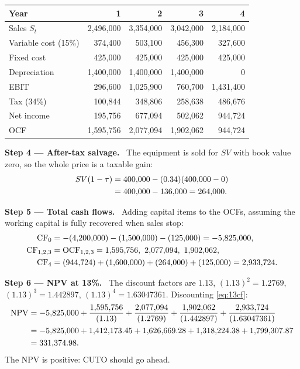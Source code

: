 \documentclass[11pt,a4paper]{article}
\numberwithin{equation}{section}
\newcommand{\step}[2]{\par\medskip\noindent\textbf{Step #1 --- #2.}~}
\begin{document}
\begin{center}
\begin{tabular}{lrrrr}
\toprule
Year & 1 & 2 & 3 & 4\\
\midrule
Sales $S_t$          & 2{,}496{,}000 & 3{,}354{,}000 & 3{,}042{,}000 & 2{,}184{,}000\\
Variable cost (15\%) & 374{,}400 & 503{,}100 & 456{,}300 & 327{,}600\\
Fixed cost           & 425{,}000 & 425{,}000 & 425{,}000 & 425{,}000\\
Depreciation         & 1{,}400{,}000 & 1{,}400{,}000 & 1{,}400{,}000 & 0\\
EBIT                 & 296{,}600 & 1{,}025{,}900 & 760{,}700 & 1{,}431{,}400\\
Tax (34\%)           & 100{,}844 & 348{,}806 & 258{,}638 & 486{,}676\\
Net income           & 195{,}756 & 677{,}094 & 502{,}062 & 944{,}724\\
OCF                  & 1{,}595{,}756 & 2{,}077{,}094 & 1{,}902{,}062 & 944{,}724\\
\bottomrule
\end{tabular}
\end{center}

\step{4}{After-tax salvage} The equipment is sold for $SV$ with book value zero, so the whole
price is a taxable gain:
\begin{align}
  SV(1-\tau) &= 400{,}000 - (0.34)(400{,}000 - 0) \notag\\
             &= 400{,}000 - 136{,}000 = 264{,}000. \label{eq:13sv}
\end{align}

\step{5}{Total cash flows} Adding capital items to the OCFs, assuming the working capital is
fully recovered when sales stop:
\begin{align}
  \mathrm{CF}_0 &= -(4{,}200{,}000) - (1{,}500{,}000) - (125{,}000) = -5{,}825{,}000, \notag\\
  \mathrm{CF}_{1,2,3} &= \mathrm{OCF}_{1,2,3} = 1{,}595{,}756,\ 2{,}077{,}094,\ 1{,}902{,}062, \notag\\
  \mathrm{CF}_4 &= (944{,}724) + (1{,}600{,}000) + (264{,}000) + (125{,}000) = 2{,}933{,}724. \label{eq:13cf}
\end{align}

\step{6}{NPV at 13\%} The discount factors are $1.13$, $(1.13)^2=1.2769$, $(1.13)^3=1.442897$,
$(1.13)^4=1.63047361$. Discounting \eqref{eq:13cf}:
\begin{align}
  \mathrm{NPV} &= -5{,}825{,}000 + \frac{1{,}595{,}756}{(1.13)} + \frac{2{,}077{,}094}{(1.2769)}
                  + \frac{1{,}902{,}062}{(1.442897)} + \frac{2{,}933{,}724}{(1.63047361)} \notag\\
               &= -5{,}825{,}000 + 1{,}412{,}173.45 + 1{,}626{,}669.28 + 1{,}318{,}224.38 + 1{,}799{,}307.87 \notag\\
               &= 331{,}374.98. \label{eq:13npv}
\end{align}
The NPV is positive: CUTO should go ahead.
\end{document}
